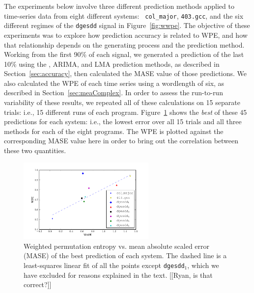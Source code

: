 







The experiments below involve three different prediction methods
applied to time-series data from eight different systems: {\tt
  col\_major}, {\tt 403.gcc}, and the six different regimes of the
{\tt dgesdd} signal in Figure~\ref{fig:wwpe}.  The objective of these
experiments was to explore how prediction accuracy is related to WPE,
and how that relationship depends on the generating process and the
prediction method.  Working from the first 90\% of each signal, we
generated a prediction of the last 10\% using the \naive, ARIMA, and
LMA prediction methods, as described in Section~\ref{sec:accuracy},
then calculated the MASE value of those predictions.  We also
calculated the WPE of each time series using a wordlength of six, as
described in Section~\ref{sec:meaComplex}.  In order to assess the
run-to-run variability of these results, we repeated all of these
calculations on 15 separate trials: i.e., 15 different runs of each
program.  Figure~\ref{fig:wpe_vs_mase_best} shows the {\sl best} of
these 45 predictions for each system: i.e., the lowest error over all
15 trials and all three methods for each of the eight programs.  The
WPE is plotted against the corresponding MASE value here in order to
bring out the correlation between these two quantities.
\begin{figure}[htbp]
  \centering
  \includegraphics[width=0.6\textwidth]{figs/prediction_vs_entropy}
  \caption{Weighted permutation entropy vs. mean absolute scaled error
    (MASE) of the best prediction of each system.
% 
% 
The dashed line is a least-squares linear fit of all the points except
{\tt dgesdd$_1$}, which we have excluded for reasons explained in the
text.  [[Ryan, is that correct?]]}
  \label{fig:wpe_vs_mase_best}
\end{figure}

